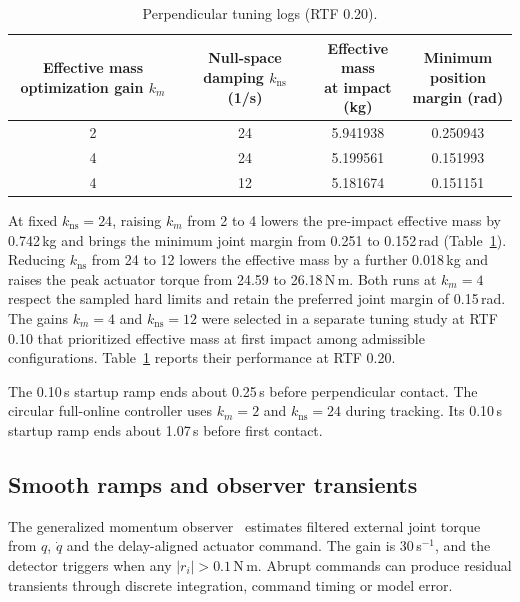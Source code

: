 \documentclass[12pt,a4paper]{article}
\begin{document}
\begin{table}[htbp]
  \centering
  \begin{tabular}{cccc}
    \toprule
    \shortstack{Effective mass\\optimization gain $k_m$}
              & \shortstack{Null-space damping\\$k_{\mathrm{ns}}$ (1/s)}
              & \shortstack{Effective mass\\at impact (kg)}
              & \shortstack{Minimum position\\margin (rad)} \\
    \midrule
    2 & 24 & 5.941938 & 0.250943 \\
    4 & 24 & 5.199561 & 0.151993 \\
    4 & 12 & 5.181674 & 0.151151 \\
    \bottomrule
  \end{tabular}
  \caption{Perpendicular tuning logs (RTF 0.20).}
  \label{tab:tuning}
\end{table}

At fixed $k_{\mathrm{ns}}=24$, raising $k_m$ from 2 to 4 lowers the pre-impact effective mass
by 0.742\,kg and brings the minimum joint margin from 0.251 to 0.152\,rad
(Table~\ref{tab:tuning}). Reducing $k_{\mathrm{ns}}$ from 24 to 12 lowers the
effective mass by a further 0.018\,kg and raises the peak actuator torque from
24.59 to 26.18\,N\,m. Both runs at $k_m=4$ respect the sampled hard limits and
retain the preferred joint margin of 0.15\,rad. The gains $k_m=4$ and
$k_{\mathrm{ns}}=12$ were selected in a separate tuning study at RTF 0.10 that
prioritized effective mass at first impact among admissible configurations.
Table~\ref{tab:tuning} reports their performance at RTF 0.20.

The 0.10\,s startup ramp ends about 0.25\,s before perpendicular contact.
The circular full-online controller uses $k_m=2$ and $k_{\mathrm{ns}}=24$ during tracking.
Its 0.10\,s startup ramp ends about 1.07\,s before first contact.

\subsection{Smooth ramps and observer transients}
The generalized momentum observer~\cite{deluca2005,haddadin2017} estimates
filtered external joint torque from $q$, $\dot q$ and the delay-aligned actuator
command. The gain is 30\,s$^{-1}$, and the detector triggers when any
$|r_i| > 0.1$\,N\,m. Abrupt commands can produce residual transients through
discrete integration, command timing or model error.
\end{document}
